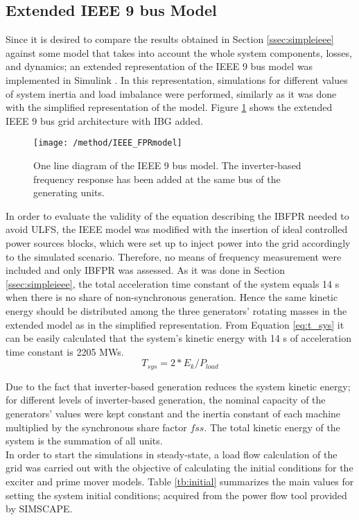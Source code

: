 \subsection{Extended IEEE 9 bus Model}

Since it is desired to compare the results obtained in Section \ref{ssec:simpleieee} against some model that takes into account the whole system components, losses, and dynamics; an extended representation of the IEEE 9 bus model was implemented in Simulink \cite{delavari2018simscape}. In this representation, simulations for different values of system inertia and load imbalance were performed, similarly as it was done with the simplified representation of the model. Figure \ref{fig:ieeeext} shows the extended IEEE 9 bus grid architecture with IBG added.\\
\begin{figure}[h]
\centering
\texttt{[image: /method/IEEE\_FPRmodel]}
\caption{One line diagram of the IEEE 9 bus model. The inverter-based frequency response has been added at the same bus of the generating units.}
\label{fig:ieeeext}
\end{figure}
In order to evaluate the validity of the equation describing the IBFPR needed to avoid ULFS, the IEEE model was modified with the insertion of ideal controlled power sources blocks, which were set up to inject power into the grid accordingly to the simulated scenario. Therefore, no means of frequency measurement were included and only IBFPR was assessed.
As it was done in Section \ref{ssec:simpleieee}, the total acceleration time constant of the system equals 14 s when there is no share of non-synchronous generation. Hence the same kinetic energy should be distributed among the three generators' rotating masses in the extended model as in the simplified representation. From Equation \eqref{eq:t_sys} it can be easily calculated that the system's kinetic energy with 14 s of acceleration time constant is 2205 MWs.
\begin{equation}
\label{eq:t_sys}
T_{sys}=2*E_{k} /P_{load}
\end{equation}

Due to the fact that inverter-based generation reduces the system kinetic energy; for different levels of inverter-based generation, the nominal capacity of the generators' values were kept constant and the inertia constant of each machine multiplied by the synchronous share factor $ fss $. The total kinetic energy of the system is the summation of all units.\\
In order to start the simulations in steady-state, a load flow calculation of the grid was carried out with the objective of calculating the initial conditions for the exciter and prime mover models.
Table \ref{tb:initial} summarizes the main values for setting the system initial conditions; acquired from the power flow tool provided by SIMSCAPE.


